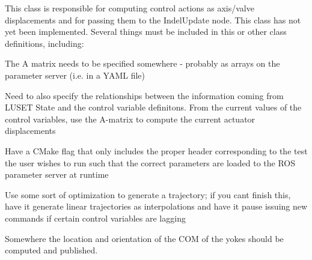 
\begin{DoxyRefList}
\item[\label{todo__todo000001}%
\Hypertarget{todo__todo000001}%
Class \hyperlink{classlusetcontrolnamespace_1_1LusetControl}{lusetcontrolnamespace\+:\+:Luset\+Control} ]This class is responsible for computing control actions as axis/valve displacements and for passing them to the Indel\+Update node. This class has not yet been implemented. Several things must be included in this or other class definitions, including\+:
\begin{DoxyItemize}
\item The A matrix needs to be specified somewhere -\/ probably as arrays on the parameter server (i.\+e. in a Y\+A\+ML file)
\item Need to also specify the relationships between the information coming from L\+U\+S\+ET State and the control variable definitons. From the current values of the control variables, use the A-\/matrix to compute the current actuator displacements
\item Have a C\+Make flag that only includes the proper header corresponding to the test the user wishes to run such that the correct parameters are loaded to the R\+OS parameter server at runtime
\item Use some sort of optimization to generate a trajectory; if you can\textquotesingle{}t finish this, have it generate linear trajectories as interpolations and have it pause issuing new commands if certain control variables are lagging
\item Somewhere the location and orientation of the C\+OM of the yokes should be computed and published. 
\end{DoxyItemize}
\end{DoxyRefList}
